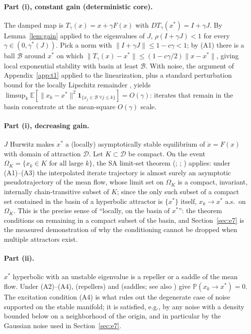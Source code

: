 \documentclass[pmlr]{jmlr}
\newcommand{\E}{\mathbb{E}}
\newcommand{\Prob}{\mathbb{P}}
\newcommand{\gstar}{\gamma^{*}}
\begin{document}
\paragraph{Part (i), constant gain (deterministic core).} The damped map is
$T_\gamma(x) = x + \gamma F(x)$ with $DT_\gamma(x^*) = I + \gamma J$. By Lemma~\ref{lem:gain}
applied to the eigenvalues of $J$, $\rho(I + \gamma J) < 1$ for every
$\gamma \in (0, \gstar(J))$. Pick a norm with $\|I + \gamma J\| \leq 1 - c\gamma < 1$; by (A1)
there is a ball $\mathcal{B}$ around $x^*$ on which
$\|T_\gamma(x) - x^* \| \leq (1 - c\gamma/2)\|x - x^*\|$, giving local exponential stability
with basin at least $\mathcal{B}$. With noise, the argument of Appendix~\ref{app:t1} applied to
the linearization, plus a standard perturbation bound for the locally Lipschitz remainder
\citep[Ch.~9]{benveniste1990adaptive}, yields
$\limsup_k \E[\|x_k - x^*\|^2 \mathbf{1}_{\{x_j \in \mathcal{B}\ \forall j \le k\}}] = O(\gamma)$:
iterates that remain in the basin concentrate at the mean-square $O(\gamma)$ scale.

\paragraph{Part (i), decreasing gain.} $J$ Hurwitz makes $x^*$ a (locally) asymptotically stable
equilibrium of $\dot{x} = F(x)$ with domain of attraction $\mathcal{D}$. Let
$K \subset \mathcal{D}$ be compact. On the event
$\Omega_K = \{x_k \in K \text{ for all large } k\}$, the SA limit-set theorem
(\citealp[Thm.~5.2.1]{kushner2003stochastic}; \citealp{benaim1999dynamics};
\citealp[Ch.~2]{borkar2008stochastic}) applies: under (A1)--(A3) the interpolated iterate
trajectory is almost surely an asymptotic pseudotrajectory of the mean flow, whose limit set on
$\Omega_K$ is a compact, invariant, internally chain-transitive subset of $K$; since the only
such subset of a compact set contained in the basin of a hyperbolic attractor is $\{x^*\}$
itself, $x_k \to x^*$ a.s.\ on $\Omega_K$. This is the precise sense of ``locally, on the basin
of $x^*$'': the theorem conditions on remaining in a compact subset of the basin, and
Section~\ref{sec:e7} is the measured demonstration of why the conditioning cannot be dropped
when multiple attractors exist.

\paragraph{Part (ii).} $x^*$ hyperbolic with an unstable eigenvalue is a repeller or a saddle of
the mean flow. Under (A2)--(A4), \citet{pemantle1990nonconvergence} (repellers) and
\citet{brandiere1996algorithmes} (saddles; see also \citealp{benaim1999dynamics}) give
$\Prob(x_k \to x^*) = 0$. The excitation condition (A4) is what rules out the degenerate case of
noise supported on the stable manifold; it is satisfied, e.g., by any noise with a density
bounded below on a neighborhood of the origin, and in particular by the Gaussian noise used in
Section~\ref{sec:e7}. \hfill\BlackBox
\end{document}
